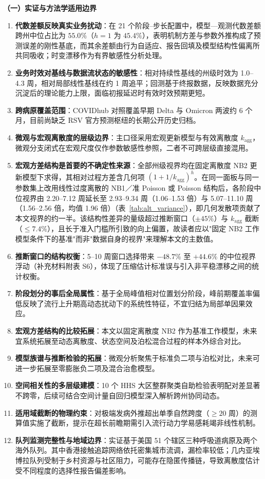 \documentclass[11pt,a4paper]{article}
\theoremstyle{plain}
\theoremstyle{definition}
\begin{document}
{\fontsize{8.0pt}{10.2pt}\selectfont
\noindent\textbf{（一）实证与方法学适用边界}

\begin{enumerate}[leftmargin=*,itemsep=0pt,topsep=1pt,parsep=0pt]
\item \textbf{代数差额反映真实业务扰动}：在 21 个阶段--步长配置中，模型—观测代数差额跨州中位占比为 $55.0\%$（$h=1$ 为 $45.4\%$），表明机制方差与参数外推构成了预测误差的刚性基底，而其余差额由行为自适应、报告回填及模型结构性偏离所共同吸收；时变漂移作为有界敏感性分析处理。
\item \textbf{业务时效对基线与数据流状态的敏感性}：相对持续性基线的州级时效为 1.0--4.3 周，相对局部线性基线在约 1 周追平；回测基于终报数据，反映数据充分沉淀后的理论能力上限，面临初报延迟时有效时效预期更短。
\item \textbf{跨病原覆盖范围}：COVIDhub 对照覆盖早期 Delta 与 Omicron 两波约 6 个月，目前尚缺乏 RSV 官方预测枢纽的长期公开历史归档。
\item \textbf{微观与宏观离散度的层级边界}：主口径采用宏观更新模型与有效离散度 $k_{\text{agg}}$，微观分支闭式在宏观尺度仅作参数敏感性参照，二者不可跨层级直接混用。
\item \textbf{宏观方差结构是首要的不确定性来源}：全部州级视界均在固定离散度 NB2 更新模型下求得，其相对过程方差含几何项 $(1+1/k_{\text{agg}})^h$。在同一面板与同一参数集上改用线性过度离散的 NB1／准 Poisson 或 Poisson 结构后，各阶段中位视界由 2.20--7.12 周延长至 2.93--9.34 周（1.06--1.53 倍）与 5.07--11.10 周（1.56--2.56 倍，均值 1.96 倍）（表~\ref{tab:alt_variance}），即几何发散项贡献了本文视界的约一半。该结构性差异的量级超过推断窗口（$\pm 45\%$）与 $k_{\text{agg}}$ 截断（$\le 7.4\%$），且长于准入门槛所引致的向上偏置，故读者应以"固定 NB2 工作模型条件下的基准"而非"数据自身的视界"来理解本文的主数值。
\item \textbf{推断窗口的结构权衡}：5--10 周窗口选择带来 $-48.7\%$ 至 $+44.6\%$ 的中位视界浮动（补充材料附表 S6），体现了压缩估计标准误与引入非平稳漂移之间的统计权衡。
\item \textbf{阶段划分的事后全局属性}：基于全局峰值相对位置划分阶段，峰前期覆盖率偏低反映了流行上升期高动态扰动下的系统性特征，不宜归结为局部单因果效应。
\item \textbf{宏观方差结构的比较拓展}：本文以固定离散度 NB2 作为基准工作模型，未来宜系统拓展至动态离散度、状态空间及泊松混合过程的样本外综合对比。
\item \textbf{模型族谱与推断检验的拓展}：微观分析聚焦于标准负二项与泊松对比，未来可进一步拓展至零膨胀负二项及混合治愈模型。
\item \textbf{空间相关性的多层级建模}：10 个 HHS 大区整群聚类自助检验表明配对差显著不跨零，后续可结合空间计量自回归模型深入解析跨州协同动态。
\item \textbf{适用域截断的物理约束}：对极端发病外推超出单季自然跨度（$\ge 20$ 周）的测算值实施了截断，提示在超长前瞻期需引入流行动力学易感耗竭非线性机制。
\item \textbf{队列监测完整性与地域边界}：实证基于美国 51 个辖区三种呼吸道病原及两个海外队列。其中香港接触追踪网络依托密集城市流调，漏检率较低；几内亚埃博拉队列受制于乡村资源与社区阻力，可能存在隐匿传播链，导致离散度估计受不同程度的选择性报告偏差影响。
\end{enumerate}

}
\end{document}
